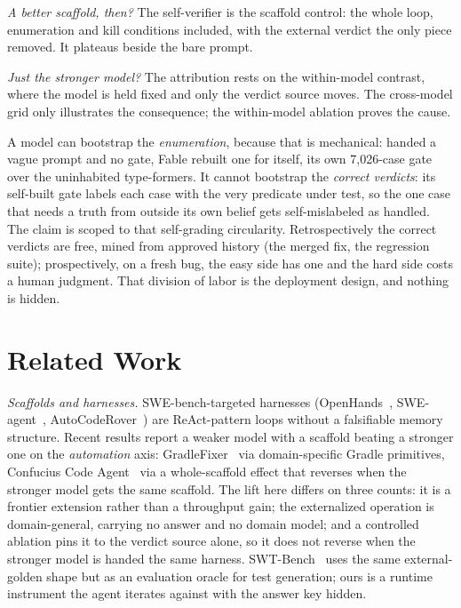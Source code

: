 \documentclass[sigconf,review,anonymous]{acmart}
\begin{document}
\emph{A better scaffold, then?} The self-verifier is the scaffold control: the whole loop, enumeration and kill conditions included, with the external verdict the only piece removed. It plateaus beside the bare prompt.

\emph{Just the stronger model?} The attribution rests on the within-model contrast, where the model is held fixed and only the verdict source moves. The cross-model grid only illustrates the consequence; the within-model ablation proves the cause.

A model can bootstrap the \emph{enumeration}, because that is mechanical: handed a vague prompt and no gate, Fable rebuilt one for itself, its own 7,026-case gate over the uninhabited type-formers. It cannot bootstrap the \emph{correct verdicts}: its self-built gate labels each case with the very predicate under test, so the one case that needs a truth from outside its own belief gets self-mislabeled as handled. The claim is scoped to that self-grading circularity. Retrospectively the correct verdicts are free, mined from approved history (the merged fix, the regression suite); prospectively, on a fresh bug, the easy side has one and the hard side costs a human judgment. That division of labor is the deployment design, and nothing is hidden.

\section{Related Work}\label{sec:related}

\emph{Scaffolds and harnesses.} SWE-bench-targeted harnesses (OpenHands~\cite{openhands}, SWE-agent~\cite{sweagent}, AutoCodeRover~\cite{autocoderover}) are ReAct-pattern loops without a falsifiable memory structure. Recent results report a weaker model with a scaffold beating a stronger one on the \emph{automation} axis: GradleFixer~\cite{gradlefixer} via domain-specific Gradle primitives, Confucius Code Agent~\cite{confucius} via a whole-scaffold effect that reverses when the stronger model gets the same scaffold. The lift here differs on three counts: it is a frontier extension rather than a throughput gain; the externalized operation is domain-general, carrying no answer and no domain model; and a controlled ablation pins it to the verdict source alone, so it does not reverse when the stronger model is handed the same harness. SWT-Bench~\cite{swtbench} uses the same external-golden shape but as an evaluation oracle for test generation; ours is a runtime instrument the agent iterates against with the answer key hidden.
\end{document}
